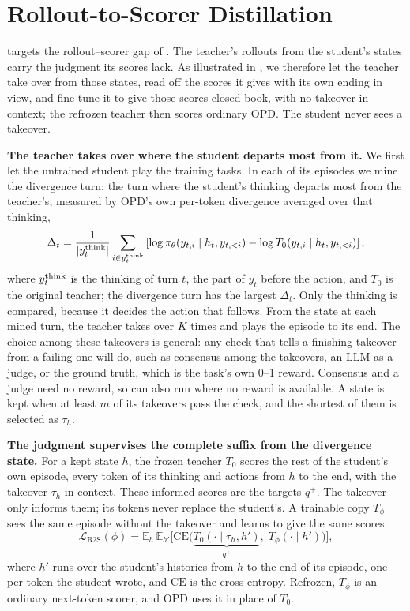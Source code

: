 \section{Rollout-to-Scorer Distillation}
\label{sec:method}
\label{sec:repairs}
\label{sec:repairs-r2s}

\method{} targets the rollout--scorer gap of . The teacher's rollouts from the student's states carry the judgment its scores lack. As illustrated in , we therefore let the teacher take over from those states, read off the scores it gives with its own ending in view, and fine-tune it to give those scores closed-book, with no takeover in context; the refrozen teacher then scores ordinary OPD. The student never sees a takeover.



\textbf{The teacher takes over where the student departs most from it.} We first let the untrained student play the training tasks. In each of its episodes we mine the divergence turn: the turn where the student's thinking departs most from the teacher's, measured by OPD's own per-token divergence averaged over that thinking,
\begin{equation}
\label{eq:divscore}
\Delta_t=\frac{1}{|y^{\mathrm{think}}_t|}\sum_{i\in y^{\mathrm{think}}_t}
\left[\log \pi_\theta(y_{t,i}\mid h_t,y_{t,<i})-\log T_0(y_{t,i}\mid h_t,y_{t,<i})\right],
\end{equation}
where $y^{\mathrm{think}}_t$ is the thinking of turn $t$, the part of $y_t$ before the action, and $T_0$ is the original teacher; the divergence turn has the largest $\Delta_t$. Only the thinking is compared, because it decides the action that follows. From the state at each mined turn, the teacher takes over $K$ times and plays the episode to its end. The choice among these takeovers is general: any check that tells a finishing takeover from a failing one will do, such as consensus among the takeovers, an LLM-as-a-judge, or the ground truth, which is the task's own 0--1 reward. Consensus and a judge need no reward, so \method{} can also run where no reward is available. A state is kept when at least $m$ of its takeovers pass the check, and the shortest of them is selected as $\tau_h$.

\textbf{The judgment supervises the complete suffix from the divergence state.}
For a kept state $h$, the frozen teacher $T_0$ scores the rest of the student's own episode, every token of its thinking and actions from $h$ to the end, with the takeover $\tau_h$ in context. These informed scores are the targets $q^+$. The takeover only informs them; its tokens never replace the student's. A trainable copy $T_\phi$ sees the same episode without the takeover and learns to give the same scores:
\begin{equation}
\label{eq:r2s}
\mathcal{L}_{\mathrm{R2S}}(\phi)=
\mathbb{E}_{h}\,\mathbb{E}_{h'}\Big[\mathrm{CE}\big(\underbrace{T_0(\cdot\mid\tau_h,h')}_{q^{+}},\;T_\phi(\cdot\mid h')\big)\Big],
\end{equation}
where $h'$ runs over the student's histories from $h$ to the end of its episode, one per token the student wrote, and $\mathrm{CE}$ is the cross-entropy. Refrozen, $T_\phi$ is an ordinary next-token scorer, and OPD uses it in place of $T_0$.
